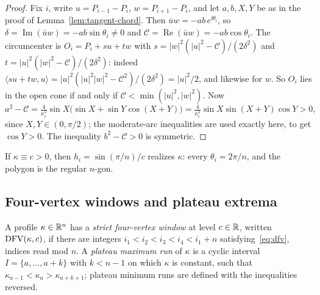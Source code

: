 \begin{proof}
Fix $i$, write $u=P_{i-1}-P_i$, $w=P_{i+1}-P_i$, and let $a,b,X,Y$ be as in
the proof of Lemma~\ref{lem:tangent-chord}. Then $\bar uw=-ab\,e^{\ii\theta_i}$,
so $\delta=\operatorname{Im}(\bar uw)=-ab\sin\theta_i\ne0$ and
$\mathcal{C}=\operatorname{Re}(\bar uw)=-ab\cos\theta_i$. The circumcenter is
$O_i=P_i+su+tw$ with
$s=|w|^2(|u|^2-\mathcal C)/(2\delta^2)$ and
$t=|u|^2(|w|^2-\mathcal C)/(2\delta^2)$: indeed
$\langle su+tw,u\rangle=|u|^2(|u|^2|w|^2-\mathcal C^2)/(2\delta^2)=|u|^2/2$,
and likewise for $w$. So $O_i$ lies in the open cone if and only if
$\mathcal C<\min(|u|^2,|w|^2)$. Now
\[
  a^2-\mathcal C=\tfrac{4}{\kappa_i^2}\sin X\bigl(\sin X+\sin Y\cos(X+Y)\bigr)
  =\tfrac{4}{\kappa_i^2}\sin X\sin(X+Y)\cos Y>0,
\]
since $X,Y\in(0,\pi/2)$; the moderate-arc inequalities are used exactly here,
to get $\cos Y>0$. The inequality $b^2-\mathcal C>0$ is symmetric.
\end{proof}

If $\kappa\equiv c>0$, then $h_i=\sin(\pi/n)/c$ realizes $\kappa$: every
$\theta_i=2\pi/n$, and the polygon is the regular $n$-gon.

\subsection{Four-vertex windows and plateau extrema}

\begin{definition}\label{def:dfv}
A profile $\kappa\in\mathbb{R}^n$ has a \emph{strict four-vertex window} at level
$c\in\mathbb{R}$, written $\operatorname{DFV}(\kappa,c)$, if there are integers
$i_1<i_2<i_3<i_4<i_1+n$ satisfying~\eqref{eq:dfv}, indices read mod $n$. A
\emph{plateau maximum run} of $\kappa$ is a cyclic interval
$I=\{a,\dots,a+k\}$ with $k<n-1$ on which $\kappa$ is constant, such that
$\kappa_{a-1}<\kappa_a>\kappa_{a+k+1}$; plateau minimum runs are defined
with the inequalities reversed.
\end{definition}

